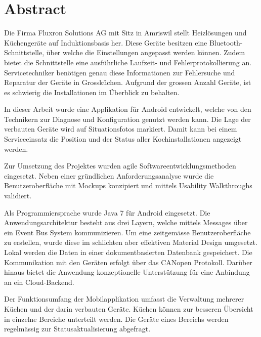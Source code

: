 
\chapter*{Abstract}

Die Firma Fluxron Solutions AG mit Sitz in Amriswil stellt Heizlösungen und Küchengeräte auf Induktionsbasis her. Diese Geräte besitzen eine Bluetooth-Schnittstelle, über welche die Einstellungen angepasst werden können. Zudem bietet die Schnittstelle eine ausführliche Laufzeit- und Fehlerprotokollierung an. Servicetechniker benötigen genau diese Informationen zur Fehlersuche und Reparatur der Geräte in Grossküchen. Aufgrund der grossen Anzahl Geräte, ist es schwierig die Installationen im Überblick zu behalten.

In dieser Arbeit wurde eine Applikation für Android entwickelt, welche von den Technikern zur Diagnose und Konfiguration genutzt werden kann. Die Lage der verbauten Geräte wird auf Situationsfotos markiert. Damit kann bei einem Serviceeinsatz die Position und der Status aller Kochinstallationen angezeigt werden.

Zur Umsetzung des Projektes wurden agile Softwareentwicklungsmethoden eingesetzt. Neben einer gründlichen Anforderungsanalyse wurde die Benutzeroberfläche mit Mockups konzipiert und mittels Usability Walkthroughs validiert.

Als Programmiersprache wurde Java 7 für Android eingesetzt. Die Anwendungsarchitektur besteht aus drei Layern, welche mittels Messages über ein Event Bus System kommunizieren. Um eine zeitgemässe Benutzeroberfläche zu erstellen, wurde diese im schlichten aber effektiven Material Design umgesetzt. Lokal werden die Daten in einer dokumentbasierten Datenbank gespeichert. Die Kommunikation mit den Geräten erfolgt über das CANopen Protokoll. Darüber hinaus bietet die Anwendung konzeptionelle Unterstützung für eine Anbindung an ein Cloud-Backend.

Der Funktionsumfang der Mobilapplikation umfasst die Verwaltung mehrerer Küchen und der darin verbauten Geräte. Küchen können zur besseren Übersicht in einzelne Bereiche unterteilt werden. Die Geräte eines Bereichs werden regelmässig zur Statusaktualisierung abgefragt. 